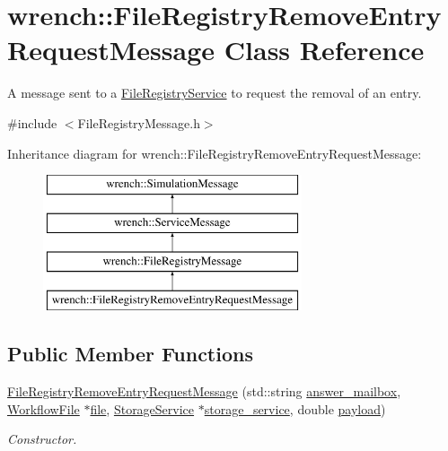 \hypertarget{classwrench_1_1_file_registry_remove_entry_request_message}{}\section{wrench\+:\+:File\+Registry\+Remove\+Entry\+Request\+Message Class Reference}
\label{classwrench_1_1_file_registry_remove_entry_request_message}


A message sent to a \hyperlink{classwrench_1_1_file_registry_service}{File\+Registry\+Service} to request the removal of an entry.  




{\ttfamily \#include $<$File\+Registry\+Message.\+h$>$}

Inheritance diagram for wrench\+:\+:File\+Registry\+Remove\+Entry\+Request\+Message\+:\begin{figure}[H]
\begin{center}
\leavevmode
\includegraphics[height=4.000000cm]{classwrench_1_1_file_registry_remove_entry_request_message}
\end{center}
\end{figure}
\subsection*{Public Member Functions}
\begin{DoxyCompactItemize}
\item 
\hyperlink{classwrench_1_1_file_registry_remove_entry_request_message_a230a875ce02f635e0c3f014a688b4e60}{File\+Registry\+Remove\+Entry\+Request\+Message} (std\+::string \hyperlink{classwrench_1_1_file_registry_remove_entry_request_message_a25d5ced262bfc6495c02f89bcb49176b}{answer\+\_\+mailbox}, \hyperlink{classwrench_1_1_workflow_file}{Workflow\+File} $\ast$\hyperlink{classwrench_1_1_file_registry_remove_entry_request_message_ab571fddd8f8fa14358c1a16aa987b6b7}{file}, \hyperlink{classwrench_1_1_storage_service}{Storage\+Service} $\ast$\hyperlink{classwrench_1_1_file_registry_remove_entry_request_message_ac437e03a1616d25d8c1480953bb52b13}{storage\+\_\+service}, double \hyperlink{classwrench_1_1_simulation_message_a914f2732713f7c02898e66f05a7cb8a1}{payload})
\begin{DoxyCompactList}\small\item\em Constructor. \end{DoxyCompactList}\end{DoxyCompactItemize}
